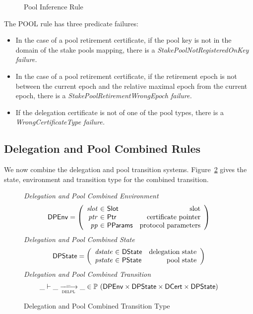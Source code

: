 \begin{figure}[hbt]
  \caption{Pool Inference Rule}
  \label{fig:pool-rules}

\end{figure}

The POOL rule has three predicate failures:
\begin{itemize}
\item In the case of a pool retirement certificate, if the pool key is not in
  the domain of the stake pools mapping, there is a
  \em{StakePoolNotRegisteredOnKey} failure.
\item In the case of a pool retirement certificate, if the retirement epoch is
  not between the current epoch and the relative maximal epoch from the current
  epoch, there is a \em{StakePoolRetirementWrongEpoch} failure.
\item If the delegation certificate is not of one of the pool types, there is a
  \em{WrongCertificateType} failure.
\end{itemize}

\clearpage

\subsection{Delegation and Pool Combined Rules}
\label{sec:del-pool-rules}

We now combine the delegation and pool transition systems.
Figure~\ref{fig:defs:delpl} gives the state, environment and transition type for the
combined transition.

\begin{figure}[hbt]
  \emph{Delegation and Pool Combined Environment}
  \begin{equation*}
    \DPEnv =
    \left(
      \begin{array}{r@{~\in~}lr}
        \var{slot} & \Slot & \text{slot}\\
        \var{ptr} & \Ptr & \text{certificate pointer}\\
        \var{pp} & \PParams & \text{protocol parameters}\\
      \end{array}
    \right)
  \end{equation*}
  \emph{Delegation and Pool Combined State}
  \begin{equation*}
    \DPState =
    \left(
      \begin{array}{r@{~\in~}lr}
        \var{dstate} & \DState & \text{delegation state}\\
        \var{pstate} & \PState & \text{pool state}\\
      \end{array}
    \right)
  \end{equation*}
  \emph{Delegation and Pool Combined Transition}
  \begin{equation*}
    \_ \vdash \_ \trans{delpl}{\_} \_ \in
      \powerset (
        \DPEnv \times \DPState \times \DCert \times \DPState)
  \end{equation*}
  \caption{Delegation and Pool Combined Transition Type}
  \label{fig:defs:delpl}
\end{figure}


